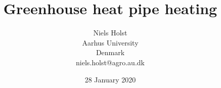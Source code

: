 \documentclass [a4paper, 11pt, openany]  {memoir}
\begin{document}
\midsloppy
\pagestyle{ruled}

\title {Greenhouse heat pipe heating}
\author{Niels Holst\\Aarhus University\\Denmark\\niels.holst@agro.au.dk}
\date{28 January 2020}
\maketitle


\end{document}
